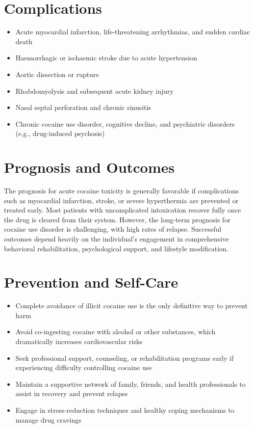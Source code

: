\section*{Complications}
\begin{itemize}
    \item Acute myocardial infarction, life-threatening arrhythmias, and sudden cardiac death
    \item Haemorrhagic or ischaemic stroke due to acute hypertension
    \item Aortic dissection or rupture
    \item Rhabdomyolysis and subsequent acute kidney injury
    \item Nasal septal perforation and chronic sinusitis
    \item Chronic cocaine use disorder, cognitive decline, and psychiatric disorders (e.g., drug-induced psychosis)
\end{itemize}

\section*{Prognosis and Outcomes}
The prognosis for acute cocaine toxicity is generally favorable if complications such as myocardial infarction, stroke, or severe hyperthermia are prevented or treated early. Most patients with uncomplicated intoxication recover fully once the drug is cleared from their system. However, the long-term prognosis for cocaine use disorder is challenging, with high rates of relapse. Successful outcomes depend heavily on the individual's engagement in comprehensive behavioral rehabilitation, psychological support, and lifestyle modification.

\section*{Prevention and Self-Care}
\begin{itemize}
    \item Complete avoidance of illicit cocaine use is the only definitive way to prevent harm
    \item Avoid co-ingesting cocaine with alcohol or other substances, which dramatically increases cardiovascular risks
    \item Seek professional support, counseling, or rehabilitation programs early if experiencing difficulty controlling cocaine use
    \item Maintain a supportive network of family, friends, and health professionals to assist in recovery and prevent relapse
    \item Engage in stress-reduction techniques and healthy coping mechanisms to manage drug cravings
\end{itemize}

